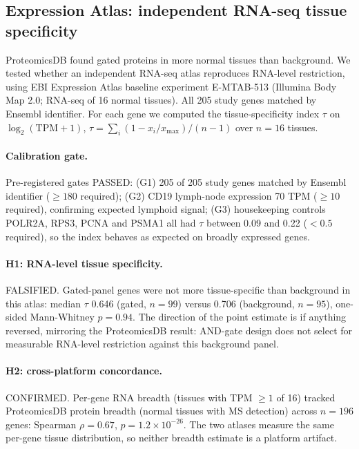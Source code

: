 \subsection{Expression Atlas: independent RNA-seq tissue specificity}
\label{sec:eatlas}
ProteomicsDB found gated proteins in more normal tissues than background.
We tested whether an independent RNA-seq atlas reproduces RNA-level
restriction, using EBI Expression Atlas baseline experiment
E-MTAB-513 (Illumina Body Map 2.0; RNA-seq of 16 normal tissues).
All 205 study genes matched by Ensembl identifier. For each gene we
computed the tissue-specificity index $\tau$ on $\log_2(\mathrm{TPM}+1)$,
$\tau=\sum_i(1-x_i/x_{\max})/(n-1)$ over $n=16$ tissues.

\paragraph{Calibration gate.} Pre-registered gates PASSED: (G1) 205
of 205 study genes matched by Ensembl identifier ($\ge 180$ required);
(G2) CD19 lymph-node expression 70 TPM ($\ge 10$ required), confirming
expected lymphoid signal; (G3) housekeeping controls POLR2A, RPS3, PCNA and
PSMA1 all had $\tau$ between 0.09 and 0.22 ($<0.5$ required), so the
index behaves as expected on broadly expressed genes.

\paragraph{H1: RNA-level tissue specificity.} FALSIFIED. Gated-panel genes
were not more tissue-specific than background in this atlas: median $\tau$
0.646 (gated, $n=99$) versus 0.706 (background, $n=95$),
one-sided Mann-Whitney $p=0.94$. The direction of the point estimate is
if anything reversed, mirroring the ProteomicsDB result: AND-gate design
does not select for measurable RNA-level restriction against this
background panel.

\paragraph{H2: cross-platform concordance.} CONFIRMED. Per-gene RNA breadth
(tissues with TPM $\ge 1$ of 16) tracked ProteomicsDB protein breadth
(normal tissues with MS detection) across $n=196$ genes: Spearman
$\rho=0.67$, $p=1.2\times10^{-26}$. The two atlases measure the same per-gene
tissue distribution, so neither breadth estimate is a platform artifact.

